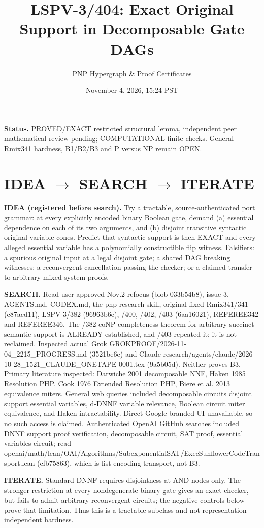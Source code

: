 \documentclass[11pt]{article}
\title{LSPV-3/404: Exact Original Support in Decomposable Gate DAGs}
\author{PNP Hypergraph \& Proof Certificates}
\date{November 4, 2026, 15:24 PST}
\begin{document}
\maketitle
\noindent\textbf{Status.} PROVED/EXACT restricted structural lemma, independent peer mathematical review pending; COMPUTATIONAL finite checks. General Rmix341 hardness, B1/B2/B3 and P versus NP remain OPEN.

\section*{IDEA \(\to\) SEARCH \(\to\) ITERATE}
\noindent\textbf{IDEA (registered before search).} Try a tractable, source-authenticated port grammar: at every explicitly encoded binary Boolean gate, demand (a) essential dependence on each of its two arguments, and (b) disjoint transitive syntactic original-variable cones. Predict that syntactic support is then EXACT and every alleged essential variable has a polynomially constructible flip witness. Falsifiers: a spurious original input at a legal disjoint gate; a shared DAG breaking witnesses; a reconvergent cancellation passing the checker; or a claimed transfer to arbitrary mixed-system proofs.

\noindent\textbf{SEARCH.} Read user-approved Nov.2 refocus (blob 033b54b8), issue 3, AGENTS.md, CODEX.md, the pnp-research skill, original fixed Rmix341/341 (c87acd11), LSPV-3/382 (96963b6e), /400, /402, /403 (6aa16021), REFEREE342 and REFEREE346. The /382 coNP-completeness theorem for arbitrary succinct semantic support is ALREADY established, and /403 repeated it; it is not reclaimed. Inspected actual Grok GROKPROOF/2026-11-04_2215_PROGRESS.md (3521be6e) and Claude research/agents/claude/2026-10-28_1521_CLAUDE_ONETAPE-0001.tex (9a5b05d). Neither proves B3. Primary literature inspected: Darwiche 2001 decomposable NNF, Haken 1985 Resolution PHP, Cook 1976 Extended Resolution PHP, Biere et al. 2013 equivalence miters. General web queries included decomposable circuits disjoint support essential variables, d-DNNF variable relevance, Boolean circuit miter equivalence, and Haken intractability. Direct Google-branded UI unavailable, so no such access is claimed. Authenticated OpenAI GitHub searches included DNNF support proof verification, decomposable circuit, SAT proof, essential variables circuit; read openai/math/lean/OAI/Algorithms/SubexponentialSAT/ExecSunflowerCodeTransport.lean (cfb75863), which is list-encoding transport, not B3.

\noindent\textbf{ITERATE.} Standard DNNF requires disjointness at AND nodes only. The stronger restriction at every nondegenerate binary gate gives an exact checker, but fails to admit arbitrary reconvergent circuits; the negative controls below prove that limitation. Thus this is a tractable subclass and not representation-independent hardness.
\end{document}

